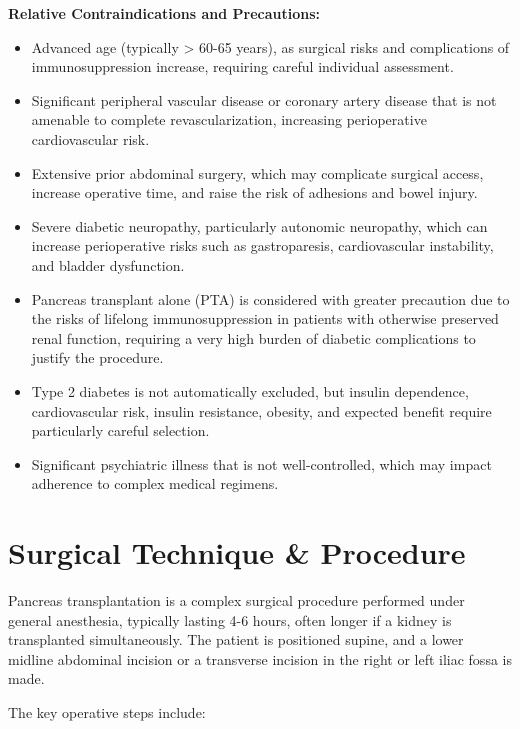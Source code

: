 \textbf{Relative Contraindications and Precautions:}
\begin{itemize}
  \item Advanced age (typically > 60-65 years), as surgical risks and complications of immunosuppression increase, requiring careful individual assessment.
  \item Significant peripheral vascular disease or coronary artery disease that is not amenable to complete revascularization, increasing perioperative cardiovascular risk.
  \item Extensive prior abdominal surgery, which may complicate surgical access, increase operative time, and raise the risk of adhesions and bowel injury.
  \item Severe diabetic neuropathy, particularly autonomic neuropathy, which can increase perioperative risks such as gastroparesis, cardiovascular instability, and bladder dysfunction.
  \item Pancreas transplant alone (PTA) is considered with greater precaution due to the risks of lifelong immunosuppression in patients with otherwise preserved renal function, requiring a very high burden of diabetic complications to justify the procedure.
  \item Type 2 diabetes is not automatically excluded, but insulin dependence, cardiovascular risk, insulin resistance, obesity, and expected benefit require particularly careful selection.
  \item Significant psychiatric illness that is not well-controlled, which may impact adherence to complex medical regimens.
\end{itemize}

\section*{Surgical Technique \& Procedure}
Pancreas transplantation is a complex surgical procedure performed under general anesthesia, typically lasting 4-6 hours, often longer if a kidney is transplanted simultaneously. The patient is positioned supine, and a lower midline abdominal incision or a transverse incision in the right or left iliac fossa is made.

The key operative steps include:

